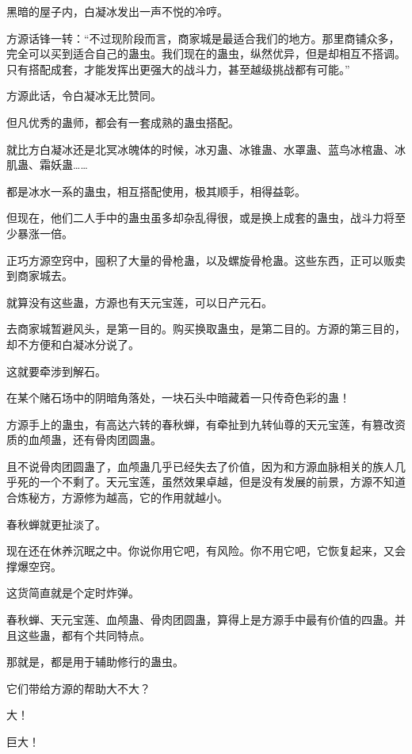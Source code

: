 
\begin{this_body}

黑暗的屋子内，白凝冰发出一声不悦的冷哼。

方源话锋一转：“不过现阶段而言，商家城是最适合我们的地方。那里商铺众多，完全可以买到适合自己的蛊虫。我们现在的蛊虫，纵然优异，但是却相互不搭调。只有搭配成套，才能发挥出更强大的战斗力，甚至越级挑战都有可能。”

方源此话，令白凝冰无比赞同。

但凡优秀的蛊师，都会有一套成熟的蛊虫搭配。

就比方白凝冰还是北冥冰魄体的时候，冰刃蛊、冰锥蛊、水罩蛊、蓝鸟冰棺蛊、冰肌蛊、霜妖蛊……

都是冰水一系的蛊虫，相互搭配使用，极其顺手，相得益彰。

但现在，他们二人手中的蛊虫虽多却杂乱得很，或是换上成套的蛊虫，战斗力将至少暴涨一倍。

正巧方源空窍中，囤积了大量的骨枪蛊，以及螺旋骨枪蛊。这些东西，正可以贩卖到商家城去。

就算没有这些蛊，方源也有天元宝莲，可以日产元石。

去商家城暂避风头，是第一目的。购买换取蛊虫，是第二目的。方源的第三目的，却不方便和白凝冰分说了。

这就要牵涉到解石。

在某个赌石场中的阴暗角落处，一块石头中暗藏着一只传奇色彩的蛊！

方源手上的蛊虫，有高达六转的春秋蝉，有牵扯到九转仙尊的天元宝莲，有篡改资质的血颅蛊，还有骨肉团圆蛊。

且不说骨肉团圆蛊了，血颅蛊几乎已经失去了价值，因为和方源血脉相关的族人几乎死的一个不剩了。天元宝莲，虽然效果卓越，但是没有发展的前景，方源不知道合炼秘方，方源修为越高，它的作用就越小。

春秋蝉就更扯淡了。

现在还在休养沉眠之中。你说你用它吧，有风险。你不用它吧，它恢复起来，又会撑爆空窍。

这货简直就是个定时炸弹。

春秋蝉、天元宝莲、血颅蛊、骨肉团圆蛊，算得上是方源手中最有价值的四蛊。并且这些蛊，都有个共同特点。

那就是，都是用于辅助修行的蛊虫。

它们带给方源的帮助大不大？

大！

巨大！


\end{this_body}
